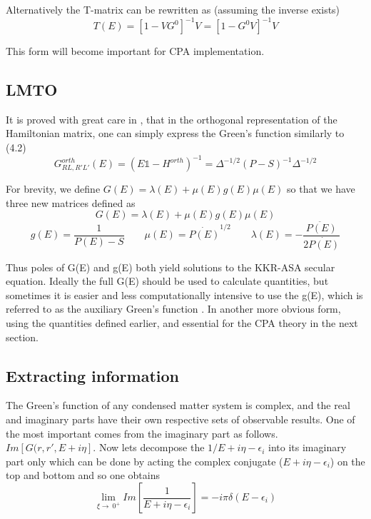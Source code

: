 \documentclass[12pt]{article}
\begin{document}
Alternatively the T-matrix can be rewritten as (assuming the inverse exists) 
\begin{equation} \label{4.1} \tag{4.8}
T(E)=[1-VG^0]^{-1}V=[1-G^0V]^{-1}V
\end{equation}

This form will become important for CPA implementation.

\subsection{LMTO}

It is proved with great care in \cite{turek}, that in the orthogonal representation of the Hamiltonian matrix, one can simply express the Green's function similarly to (4.2)
\begin{equation} \label{4.1} \tag{4.9}
G^{orth}_{RL,R'L'}(E)=(E\mathds{1}-H^{orth})^{-1}=\Delta^{-1/2}(P-S)^{-1}\Delta^{-1/2}
\end{equation}


For brevity, we define $G(E)= \lambda(E) +\mu(E)g(E)\mu(E)$ so that we have three new matrices defined as\cite{drchal}
\begin{equation} \label{4.1} \tag{4.10}
G(E)= \lambda(E) +\mu(E)g(E)\mu(E)
\end{equation}
\begin{equation} \label{4.1} \tag{4.11}
g(E)=\frac{1}{P(E)-S} \qquad \mu(E)= \dot{P(E)}^{1/2} \qquad \lambda(E)=- \frac{\ddot{P(E)}}{2\dot{P(E)}}
\end{equation}

Thus poles of G(E) and g(E) both yield solutions to the KKR-ASA secular equation. Ideally the full G(E) should be used to calculate quantities, but sometimes it is easier and less computationally intensive to use the g(E), which is referred to as the auxiliary Green's function \cite{andersen}. In another more obvious form, using the quantities defined earlier, and essential for the CPA theory in the next section.

\subsection{Extracting information}

The Green's function of any condensed matter system is complex, and the real and imaginary parts have their own respective sets of observable results. One of the most important comes from the imaginary part as follows. 
$Im[G(r,r',E+i\eta]$. Now lets decompose the $1/E+i\eta-\epsilon_i$ into its imaginary part only which can be done by acting the complex conjugate ($E+i\eta-\epsilon_i$) on the top and bottom and so one obtains 
\begin{equation} \label{4.1} \tag{4.12}
\lim_{\xi\to\ 0^+}Im[\frac{1}{E+i\eta-\epsilon_i}]=-i\pi \delta(E-\epsilon_i)
\end{equation}
\end{document}
